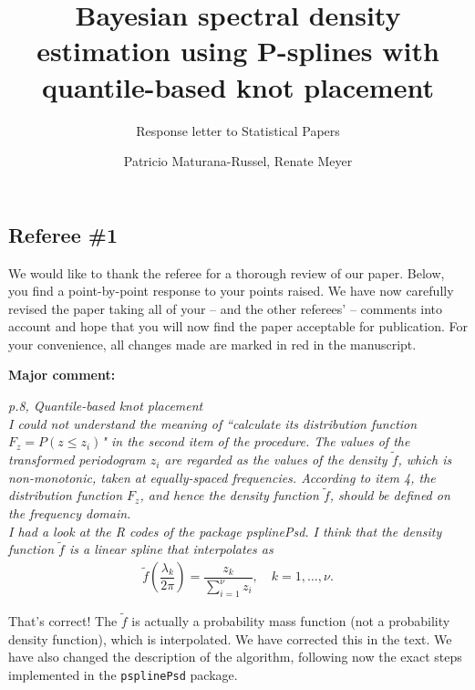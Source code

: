 \documentclass{scrartcl}
\title{Bayesian spectral density estimation using P-splines with quantile-based knot placement}
\subtitle{Response letter to Statistical Papers}
\author{Patricio Maturana-Russel, Renate Meyer}
\newcommand{\refereeQuote}{\textit }
\newcommand{\response}{}
\begin{document}
\maketitle\thispagestyle{empty}




\subsection*{Referee \#1}

\response{We would like to thank the referee for a thorough review of our paper. Below, you find a point-by-point response to your points raised. We have now carefully revised the paper taking all of your -- and the other referees' -- comments into account and hope that you will now find the paper acceptable for publication. For your convenience, all changes made are marked in red in the manuscript.} 

\textbf{Major comment:}

\refereeQuote{p.8, Quantile-based knot placement\\
I could not understand the meaning of ``calculate its distribution function $F_z = P(z \leq z_i)$" in the second item of the procedure.  The values of the transformed periodogram $z_i$ are regarded as the values of the density $\tilde{f}$, which is non-monotonic, taken at equally-spaced frequencies.  According to item 4, the distribution function $F_z$, and hence the density function $\tilde{f}$, should be defined on the frequency domain. \\
I had a look at the R codes of the package psplinePsd. I think that the density function $\tilde{f}$ is a linear spline that interpolates as
\begin{align*}
\tilde{f} \left(\dfrac{\lambda_k}{2\pi}\right) = \dfrac{z_k}{\sum_{i=1}^{\nu}z_i}, \quad k=1,\dots,\nu.
\end{align*}
}

\response{That's correct!  The $\widetilde{f}$ is actually a probability mass function (not a probability density function), which is interpolated.  We have corrected this in the text.  We have also changed the description of the algorithm, following now the exact steps implemented in the \texttt{psplinePsd} package.}\bigskip 
\end{document}

